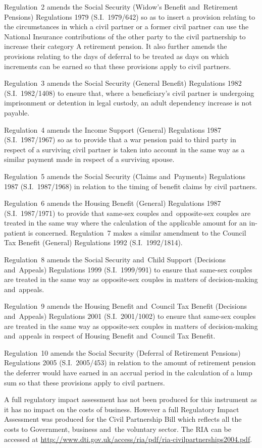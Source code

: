 \documentclass[12pt,a4paper]{article}
\begin{document}
Regulation~2 amends the Social Security (Widow’s Benefit and~Retirement Pensions) Regulations 1979 (S.I.~1979/642) so as to insert a provision relating to the circumstances in which a civil partner or a former civil partner can use the National Insurance contributions of the other party to the civil partnership to increase their category A retirement pension. It also further amends the provisions relating to the days of deferral to be treated as days on which increments can be earned so that these provisions apply to civil partners.

Regulation~3 amends the Social Security (General Benefit) Regulations 1982 (S.I.~1982/1408) to ensure that, where a beneficiary’s civil partner is undergoing imprisonment or detention in legal custody, an adult dependency increase is not payable.

Regulation~4 amends the Income Support (General) Regulations 1987 (S.I.~1987/\hspace{0pt}1967) so as to provide that a war pension paid to third party in respect of a surviving civil partner is taken into account in the same way as a similar payment made in respect of a surviving spouse.

Regulation~5 amends the Social Security (Claims and~Payments) Regulations 1987 (S.I.~1987/1968) in relation to the timing of benefit claims by civil partners.

Regulation~6 amends the Housing Benefit (General) Regulations 1987 (S.I.~1987/\hspace{0pt}1971) to provide that same-sex couples and~opposite-sex couples are treated in the same way where the calculation of the applicable amount for an in-patient is concerned. Regulation~7 makes a similar amendment to the Council Tax Benefit (General) Regulations 1992 (S.I.~1992/1814).

Regulation~8 amends the Social Security and~Child Support (Decisions and~Appeals) Regulations 1999 (S.I.~1999/991) to ensure that same-sex couples are treated in the same way as opposite-sex couples in matters of decision-making and~appeals.

Regulation~9 amends the Housing Benefit and~Council Tax Benefit (Decisions and~Appeals) Regulations 2001 (S.I.~2001/1002) to ensure that same-sex couples are treated in the same way as opposite-sex couples in matters of decision-making and~appeals in respect of Housing Benefit and~Council Tax Benefit.

Regulation~10 amends the Social Security (Deferral of Retirement Pensions) Regulations 2005 (S.I.~2005/453) in relation to the amount of retirement pension the deferrer would have earned in an accrual period in the calculation of a lump sum so that these provisions apply to civil partners.

A full regulatory impact assessment has not been produced for this instrument as it has no impact on the costs of business. However a full Regulatory Impact Assessment was produced for the Civil Partnership Bill which reflects all the costs to Government, business and~the voluntary sector. The RIA can be accessed at \url{http://www.dti.gov.uk/access/ria/pdf/ria-civilpartnerships2004.pdf}. 
\end{document}
